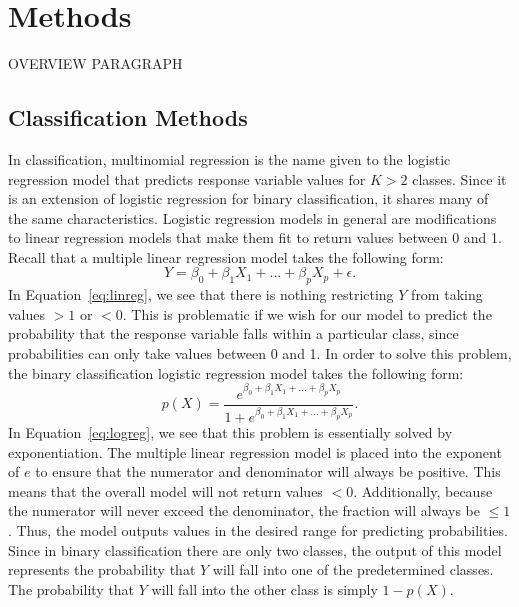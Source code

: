\documentclass[12pt]{article}
\begin{document}
\section{Methods}
\label{sec:meth}

OVERVIEW PARAGRAPH

\subsection{Classification Methods}
\label{sec:class}

In classification, multinomial regression is the name given to the 
logistic regression model that predicts response variable values 
for $K > 2$ classes.  Since it is an extension of logistic regression 
for binary classification, it shares many of the same characteristics.  
Logistic regression models in general are modifications to linear 
regression models that make them fit to return values between 0 and 1.  
Recall that a multiple linear regression model takes the following form:
\begin{equation}
  \label{eq:linreg}
  Y = \beta_0 + \beta_1X_1 + ... + \beta_pX_p + \epsilon.
\end{equation}
In Equation~\eqref{eq:linreg}, we see that there is nothing restricting 
$Y$ from taking values $> 1$ or $< 0$.  This is problematic if we wish 
for our model to predict the probability that the response variable 
falls within a particular class, since probabilities can only take values 
between 0 and 1.  In order to solve this problem, the binary classification 
logistic regression model takes the following form:
\begin{equation}
  \label{eq:logreg}
  p(X) = 
  \frac{e ^ {\beta_0 + \beta_1X_1 + ... + \beta_pX_p}} 
  {1 + e ^ {\beta_0 + \beta_1X_1 + ... + \beta_pX_p}}.
\end{equation}
In Equation~\eqref{eq:logreg}, we see that this problem is essentially 
solved by exponentiation.  The multiple linear regression model is placed 
into the exponent of $e$ to ensure that the numerator and denominator will 
always be positive.  This means that the overall model will not return values 
$< 0$.  Additionally, because the numerator will never exceed the denominator, 
the fraction will always be $\leq 1$.  Thus, the model outputs values in the 
desired range for predicting probabilities.  Since in binary classification 
there are only two classes, the output of this model represents the probability 
that $Y$ will fall into one of the predetermined classes.  The probability that 
$Y$ will fall into the other class is simply $1 - p(X)$.
\end{document}
